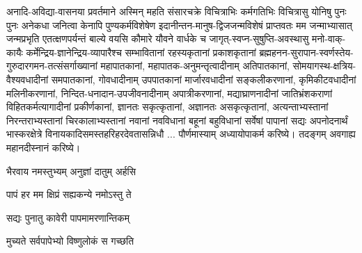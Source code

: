 अनादि-अविद्या-वासनया प्रवर्तमाने अस्मिन् महति संसारचक्रे विचित्राभिः
कर्मगतिभिः विचित्रासु योनिषु पुनः पुनः अनेकधा जनित्वा केनापि पुण्यकर्मविशेषेण
इदानीन्तन-मानुष-द्विजजन्मविशेषं प्राप्त\-वतः मम जन्माभ्यासात् जन्मप्रभृति एतत्क्षण\-पर्यन्तं बाल्ये वयसि
कौमारे यौवने वार्धके च जागृत्-स्वप्न-सुषुप्ति-अवस्थासु मनो-वाक्-कायैः
कर्मेन्द्रिय-ज्ञानेन्द्रिय-व्यापारैश्च सम्भावितानां रहस्यकृतानां प्रकाशकृतानां ब्रह्महनन-सुरापान-स्वर्णस्तेय-गुरुदारगमन-तत्संसर्गाख्यानां महा\-पातकानां, महापातक-अनुमन्तृत्वादीनाम् अति\-पातकानां,
सोमयागस्थ-क्षत्रिय-वैश्य\-वधादीनां सम\-पातकानां, गो\-वधादीनाम् उप\-पातकानां मार्जार\-वधादीनां सङ्कली\-करणानां,
कृमिकीट\-वधादीनां मलिनी\-करणानां, निन्दित-धनादान-उपजीवनादीनाम् अपात्री\-करणानां, मद्याघ्राणनादीनां जातिभ्रंशकराणां विहितकर्मत्यागादीनां
प्रकीर्णकानां, ज्ञानतः सकृत्कृतानां, अज्ञानतः असकृत्कृतानां, अत्यन्ताभ्यस्तानां निरन्तरा\-भ्यस्तानां
चिरकालाभ्यस्तानां नवानां नवविधानां बहूनां बहुविधानां सर्वेषां पापानां सद्यः अपनोदनार्थं
भास्कर\-क्षेत्रे विनायकादि\-समस्त\-हरिहर\-देवतासन्निधौ ... पौर्णमास्याम् अध्यायोपा\-कर्म करिष्ये। तदङ्गम्
अवगाह्य महानदीस्नानं करिष्ये।\\


{भैरवाय नमस्तुभ्यम् अनुज्ञां दातुम् अर्हसि}%

{पापं हर मम क्षिप्रं सह्यकन्ये नमोऽस्तु ते}%

{सद्यः पुनातु कावेरी पापमामरणान्तिकम्}%

{मुच्यते सर्वपापेभ्यो विष्णुलोकं स गच्छति}%



